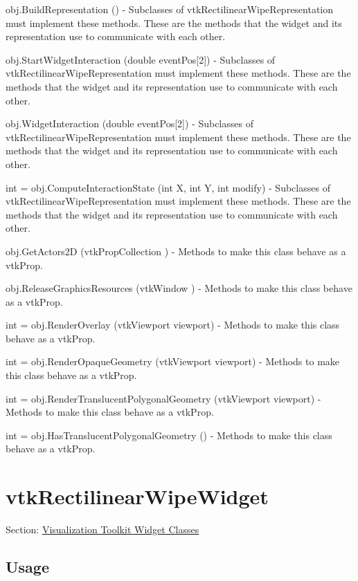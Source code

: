 \begin{DoxyItemize}
\item {\ttfamily obj.\-Build\-Representation ()} -\/ Subclasses of vtk\-Rectilinear\-Wipe\-Representation must implement these methods. These are the methods that the widget and its representation use to communicate with each other.  
\item {\ttfamily obj.\-Start\-Widget\-Interaction (double event\-Pos\mbox{[}2\mbox{]})} -\/ Subclasses of vtk\-Rectilinear\-Wipe\-Representation must implement these methods. These are the methods that the widget and its representation use to communicate with each other.  
\item {\ttfamily obj.\-Widget\-Interaction (double event\-Pos\mbox{[}2\mbox{]})} -\/ Subclasses of vtk\-Rectilinear\-Wipe\-Representation must implement these methods. These are the methods that the widget and its representation use to communicate with each other.  
\item {\ttfamily int = obj.\-Compute\-Interaction\-State (int X, int Y, int modify)} -\/ Subclasses of vtk\-Rectilinear\-Wipe\-Representation must implement these methods. These are the methods that the widget and its representation use to communicate with each other.  
\item {\ttfamily obj.\-Get\-Actors2\-D (vtk\-Prop\-Collection )} -\/ Methods to make this class behave as a vtk\-Prop.  
\item {\ttfamily obj.\-Release\-Graphics\-Resources (vtk\-Window )} -\/ Methods to make this class behave as a vtk\-Prop.  
\item {\ttfamily int = obj.\-Render\-Overlay (vtk\-Viewport viewport)} -\/ Methods to make this class behave as a vtk\-Prop.  
\item {\ttfamily int = obj.\-Render\-Opaque\-Geometry (vtk\-Viewport viewport)} -\/ Methods to make this class behave as a vtk\-Prop.  
\item {\ttfamily int = obj.\-Render\-Translucent\-Polygonal\-Geometry (vtk\-Viewport viewport)} -\/ Methods to make this class behave as a vtk\-Prop.  
\item {\ttfamily int = obj.\-Has\-Translucent\-Polygonal\-Geometry ()} -\/ Methods to make this class behave as a vtk\-Prop.  
\end{DoxyItemize}\hypertarget{vtkwidgets_vtkrectilinearwipewidget}{}\section{vtk\-Rectilinear\-Wipe\-Widget}\label{vtkwidgets_vtkrectilinearwipewidget}
Section\-: \hyperlink{sec_vtkwidgets}{Visualization Toolkit Widget Classes} \hypertarget{vtkwidgets_vtkxyplotwidget_Usage}{}\subsection{Usage}\label{vtkwidgets_vtkxyplotwidget_Usage}
